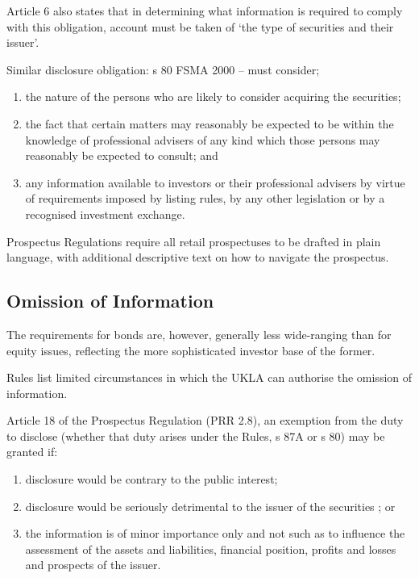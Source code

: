 \documentclass[
]{article}
\providecommand{\tightlist}{%
  \setlength{\itemsep}{0pt}\setlength{\parskip}{0pt}}
\begin{document}
Article 6 also states that in determining what information is required
to comply with this obligation, account must be taken of `the type of
securities and their issuer'.

Similar disclosure obligation: s 80 FSMA 2000 -- must consider;

\begin{enumerate}
\def\labelenumi{\arabic{enumi}.}
\tightlist
\item
  the nature of the persons who are likely to consider acquiring the
  securities;
\item
  the fact that certain matters may reasonably be expected to be within
  the knowledge of professional advisers of any kind which those persons
  may reasonably be expected to consult; and
\item
  any information available to investors or their professional advisers
  by virtue of requirements imposed by listing rules, by any other
  legislation or by a recognised investment exchange.
\end{enumerate}

Prospectus Regulations require all retail prospectuses to be drafted in
plain language, with additional descriptive text on how to navigate the
prospectus.

\hypertarget{omission-of-information}{%
\subsection{Omission of Information}\label{omission-of-information}}

The requirements for bonds are, however, generally less wide-ranging
than for equity issues, reflecting the more sophisticated investor base
of the former.

Rules list limited circumstances in which the UKLA can authorise the
omission of information.

Article 18 of the Prospectus Regulation (PRR 2.8), an exemption from the
duty to disclose (whether that duty arises under the Rules, s 87A or s
80) may be granted if:

\begin{enumerate}
\def\labelenumi{\arabic{enumi}.}
\tightlist
\item
  disclosure would be contrary to the public interest;
\item
  disclosure would be seriously detrimental to the issuer of the
  securities ; or
\item
  the information is of minor importance only and not such as to
  influence the assessment of the assets and liabilities, financial
  position, profits and losses and prospects of the issuer.
\end{enumerate}
\end{document}
